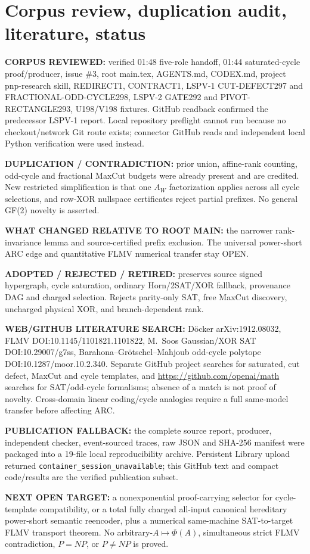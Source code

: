 \documentclass[11pt]{article}
\begin{document}
\section{Corpus review, duplication audit, literature, status}
\noindent\textbf{CORPUS REVIEWED:} verified 01:48 five-role handoff, 01:44 saturated-cycle proof/producer, issue \#3, root main.tex, AGENTS.md, CODEX.md, project pnp-research skill, REDIRECT1, CONTRACT1, LSPV-1 CUT-DEFECT297 and FRACTIONAL-ODD-CYCLE298, LSPV-2 GATE292 and PIVOT-RECTANGLE293, U198/V198 fixtures. GitHub readback confirmed the predecessor LSPV-1 report. Local repository preflight cannot run because no checkout/network Git route exists; connector GitHub reads and independent local Python verification were used instead.
\par\noindent\textbf{DUPLICATION / CONTRADICTION:} prior union, affine-rank counting, odd-cycle and fractional MaxCut budgets were already present and are credited. New restricted simplification is that one $A_W$ factorization applies across all cycle selections, and row-XOR nullspace certificates reject partial prefixes. No general GF(2) novelty is asserted.
\par\noindent\textbf{WHAT CHANGED RELATIVE TO ROOT MAIN:} the narrower rank-invariance lemma and source-certified prefix exclusion. The universal power-short ARC edge and quantitative FLMV numerical transfer stay OPEN.
\par\noindent\textbf{ADOPTED / REJECTED / RETIRED:} preserves source signed hypergraph, cycle saturation, ordinary Horn/2SAT/XOR fallback, provenance DAG and charged selection. Rejects parity-only SAT, free MaxCut discovery, uncharged physical XOR, and branch-dependent rank.
\par\noindent\textbf{WEB/GITHUB LITERATURE SEARCH:} D\"ocker arXiv:1912.08032, FLMV DOI:10.1145/1101821.1101822, M.~Soos Gaussian/XOR SAT DOI:10.29007/g7ss, Barahona--Gr\"otschel--Mahjoub odd-cycle polytope DOI:10.1287/moor.10.2.340. Separate GitHub project searches for saturated, cut defect, MaxCut and cycle templates, and \url{https://github.com/openai/math} searches for SAT/odd-cycle formalisms; absence of a match is not proof of novelty. Cross-domain linear coding/cycle analogies require a full same-model transfer before affecting ARC.
\par\noindent\textbf{PUBLICATION FALLBACK:} the complete source report, producer, independent checker, event-sourced traces, raw JSON and SHA-256 manifest were packaged into a 19-file local reproducibility archive. Persistent Library upload returned \texttt{container\_session\_unavailable}; this GitHub text and compact code/results are the verified publication subset.
\par\noindent\textbf{NEXT OPEN TARGET:} a nonexponential proof-carrying selector for cycle-template compatibility, or a total fully charged all-input canonical hereditary power-short semantic reencoder, plus a numerical same-machine SAT-to-target FLMV transport theorem. No arbitrary-$A\mapsto\Phi(A)$, simultaneous strict FLMV contradiction, $P=NP$, or $P\ne NP$ is proved.
\end{document}
